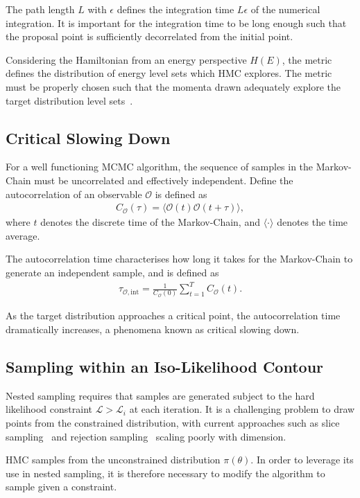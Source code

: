 \documentclass[11pt]{article}
\begin{document}
    The path length $L$ with $\epsilon$ defines the integration time $L\epsilon$ of the numerical integration.
    It is important for the integration time to be long enough such that the proposal point is sufficiently decorrelated
    from the initial point.

    Considering the Hamiltonian from an energy perspective $H(E)$, the metric defines the distribution of energy level
    sets which HMC explores.
    The metric must be properly chosen such that the momenta drawn adequately explore the target distribution level
    sets~\cite{betancourt2016energymetric}.

\subsection{Critical Slowing Down}\label{subsec:critical_slowing}
    For a well functioning MCMC algorithm, the sequence of samples in the Markov-Chain must be uncorrelated and
    effectively independent.
    Define the autocorrelation of an observable $\mathcal{O}$ is defined as
    \begin{equation}\label{eq:autocorrelation}
    \begin{aligned}
        C_{\mathcal{O}}(\tau) = \langle \mathcal{O}(t) \mathcal{O}(t + \tau) \rangle,
    \end{aligned}
    \end{equation}
    where $t$ denotes the discrete time of the Markov-Chain, and $\langle \cdot \rangle$ denotes the time average.

    The autocorrelation time characterises how long it takes for the Markov-Chain to generate an independent sample,
    and is defined as
    \begin{equation}\label{eq:autocorrelation_time}
    \begin{aligned}
        \tau_{\mathcal{O}, \text{int}} = \frac{1}{C_{\mathcal{O}}(0)} \sum_{t=1}^T C_{\mathcal{O}}(t).
    \end{aligned}
    \end{equation}

    As the target distribution approaches a critical point, the autocorrelation time dramatically increases, a phenomena
    known as critical slowing down.

\subsection{Sampling within an Iso-Likelihood Contour}\label{subsec:isolikelood_sampling}
    Nested sampling requires that samples are generated subject to the hard likelihood constraint
    $\mathcal{L} > \mathcal{L}_i$ at each iteration.
    It is a challenging problem to draw points from the constrained distribution, with current approaches such as
    slice sampling~\cite{neal2003slice} and rejection sampling~\cite{Feroz_2009} scaling poorly with dimension.

    HMC samples from the unconstrained distribution $\pi(\theta)$.
    In order to leverage its use in nested sampling, it is therefore necessary to modify the algorithm to sample
    given a constraint.
\end{document}
